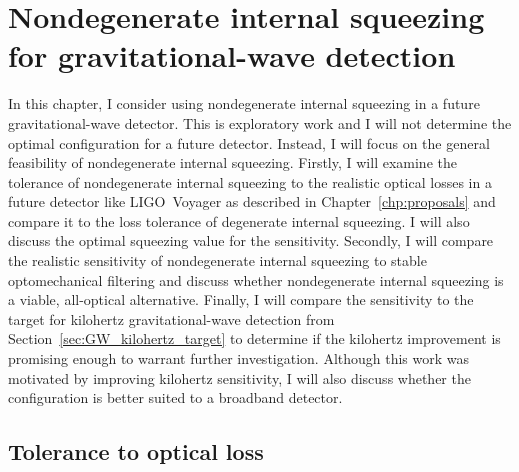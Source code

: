 \chapter{Nondegenerate internal squeezing for gravitational-wave detection}
\label{chp:science_case}


In this chapter, I consider using nondegenerate internal squeezing in a future gravitational-wave detector. This is exploratory work and I will not determine the optimal configuration for a future detector. Instead, I will focus on the general feasibility of nondegenerate internal squeezing. %
Firstly, I will examine the tolerance of nondegenerate internal squeezing to the realistic optical losses in a future detector like LIGO~Voyager as described in Chapter~\ref{chp:proposals} and compare it to the loss tolerance of degenerate internal squeezing. I will also discuss the optimal squeezing value for the sensitivity. Secondly, I will compare the realistic sensitivity of nondegenerate internal squeezing to stable optomechanical filtering and discuss whether nondegenerate internal squeezing is a viable, all-optical alternative. Finally, I will compare the sensitivity to the target for kilohertz gravitational-wave detection from Section~\ref{sec:GW_kilohertz_target} to determine if the kilohertz improvement is promising enough to warrant further investigation. Although this work was motivated by improving kilohertz sensitivity, I will also discuss whether the configuration is better suited to a broadband detector. %

\section{Tolerance to optical loss}
\label{sec:nIS_tolerance_to_losses}

